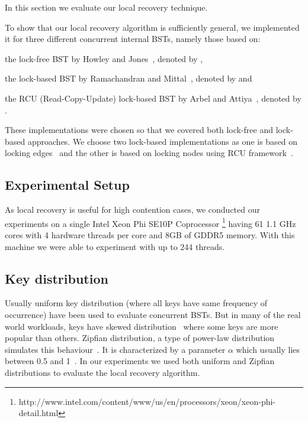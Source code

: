\newcommand{\retries}{\emph {retries}}
\newcommand{\seekTime}{\emph {seek-time}}
\newcommand{\modifyTime}{\emph {modify-time}}
\newcommand{\seekLength}{\emph {seek-length}}
\newcommand{\estLatencyImpact}{\emph {latency-impact}}
\newcommand{\throughput}{\emph {throughput}}
\newcommand{\action}{modify}

In this section we evaluate our local recovery technique. 

To show that our local recovery algorithm is sufficiently general, we implemented it for three different concurrent internal BSTs, namely those based on:
\begin{enumerate*}[label=(\roman*)]
\item the lock-free BST by Howley and Jones~\cite{HowJon:2012:SPAA}, denoted by \HJBST{},
\item the lock-based BST by Ramachandran and Mittal~\cite{RamMit:2015:PPoPP}, denoted by \CASTLE{} and
\item the RCU (Read-Copy-Update) lock-based BST by Arbel and Attiya~\cite{ArbAtt:2014:PODC}, denoted by \CITRUS{}.
\end{enumerate*}
These implementations were chosen so that we covered both lock-free and lock-based approaches. We choose two lock-based implementations as one is based on locking edges~\cite{RamMit:2015:PPoPP} and the other is based on locking nodes using RCU framework~\cite{ArbAtt:2014:PODC}.

\subsection*{Experimental Setup}
As local recovery is useful for high contention cases, we conducted our experiments on a single Intel Xeon Phi SE10P Coprocessor \footnote{http://www.intel.com/content/www/us/en/processors/xeon/xeon-phi-detail.html}
having 61 1.1 GHz cores with 4 hardware threads per core and 8GB of GDDR5 memory. With this machine we were able to experiment with up to 244 threads.

\subsection*{Key distribution}
Usually uniform key distribution (where all keys have same frequency of occurrence) have been used to evaluate concurrent BSTs. But in many of the real world workloads, keys have skewed distribution~\cite{ClaSha+:2009:SIAM} where some keys are more popular than others. Zipfian distribution, a type of power-law distribution simulates this behaviour~\cite{BreCao+:1999:INFOCOM,FalJag:1992:VLDB,GraSun+:1994:SIGMOD}. It is characterized by a parameter $\alpha$ which usually lies between 0.5 and 1~\cite{BreCao+:1999:INFOCOM,AdaHub:2002:GLOTTMET}. In our experiments we used both uniform and Zipfian distributions to evaluate the local recovery algorithm.


